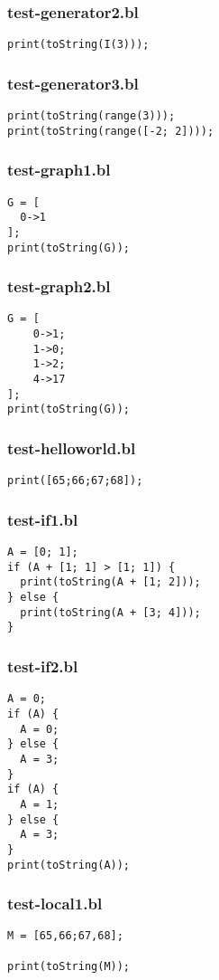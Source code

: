 \subsubsection{test-generator2.bl}
\begin{lstlisting}
print(toString(I(3)));\end{lstlisting}
\subsubsection{test-generator3.bl}
\begin{lstlisting}
print(toString(range(3)));
print(toString(range([-2; 2])));
\end{lstlisting}
\subsubsection{test-graph1.bl}
\begin{lstlisting}
G = [
  0->1
];
print(toString(G));\end{lstlisting}
\subsubsection{test-graph2.bl}
\begin{lstlisting}
G = [
    0->1;
    1->0;
    1->2;
    4->17
];
print(toString(G));\end{lstlisting}
\subsubsection{test-helloworld.bl}
\begin{lstlisting}
print([65;66;67;68]);
\end{lstlisting}
\subsubsection{test-if1.bl}
\begin{lstlisting}
A = [0; 1];
if (A + [1; 1] > [1; 1]) {
  print(toString(A + [1; 2]));
} else {
  print(toString(A + [3; 4]));
}\end{lstlisting}
\subsubsection{test-if2.bl}
\begin{lstlisting}
A = 0;
if (A) {
  A = 0;
} else {
  A = 3;
}
if (A) {
  A = 1;
} else {
  A = 3;
}
print(toString(A));
\end{lstlisting}
\subsubsection{test-local1.bl}
\begin{lstlisting}
M = [65,66;67,68];

print(toString(M));
\end{lstlisting}
